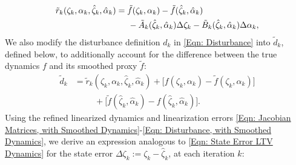 \documentclass[letterpaper, 10 pt, conference]{ieeeconf}
\newcommand{\?}{\stackrel{?}{=}}
\newcommand{\ratePGDNominal}{\hat\ratePGD}
\newcommand{\ratePGDError}{\Delta\ratePGD}
\newcommand{\linearizationError}{r}
\newcommand{\disturbance}{d}
\newcommand{\linearizationErrorSmoothed}{\tilde{\linearizationError}}
\newcommand{\disturbanceSmoothed}{\tilde{\disturbance}}
\newcommand{\ratePGD}{\alpha}
\newcommand{\jacobianState}{A}
\newcommand{\jacobianControl}{B}
\newcommand{\jacobianStateSmoothed}{\tilde{\jacobianState}}
\newcommand{\jacobianControlSmoothed}{\tilde{\jacobianControl}}
\newcommand{\state}{\zeta}
\newcommand{\stateNominal}{\hat\state}
\newcommand{\stateError}{\Delta\state}
\newcommand{\dynamicsFullState}{f}
\newcommand{\dynamicsFullStateSmoothed}{{\tilde{\dynamicsFullState}}}
\newcommand{\frank}[1]{{\textcolor[rgb]{0,0,1}{\textsf{[Frank: {#1}]}}}}
\newcommand{\antoine}[1]{{\textcolor[rgb]{1,0,0}{\textsf{[Antoine: {#1}]}}}}
\begin{document}
{
\setlength{\abovedisplayskip}{3.5pt}
\setlength{\belowdisplayskip}{3.5pt}
\begin{align}
\label{Eqn: Linearization Error, with Smoothed Dynamics}
    \linearizationErrorSmoothed_k(\state_k, \ratePGD_k, \stateNominal_k, \ratePGDNominal_k)  & = \dynamicsFullStateSmoothed(\state_k, \ratePGD_k) - \dynamicsFullStateSmoothed(\stateNominal_k, \ratePGDNominal_k) \\ \nonumber 
    &\hspace{5mm} - \jacobianStateSmoothed_k(\stateNominal_k, \ratePGDNominal_k) \stateError_k - \jacobianControlSmoothed_k(\stateNominal_k, \ratePGDNominal_k) \ratePGDError_k,
\end{align}
}
\hspace{-1mm}We also modify the disturbance definition $\disturbance_k$ in \eqref{Eqn: Disturbance}
into $\disturbanceSmoothed_k$,
defined below,
to additionally account for the difference between the true dynamics $\dynamicsFullState$ and its smoothed proxy $\dynamicsFullStateSmoothed$:
{
\setlength{\abovedisplayskip}{3.5pt}
\setlength{\belowdisplayskip}{3.5pt}
\begin{align} 
\label{Eqn: Disturbance, with Smoothed Dynamics}
    \disturbanceSmoothed_k &= \linearizationErrorSmoothed_k(\state_k, \ratePGD_k, \stateNominal_k, \ratePGDNominal_k) + \big[ \dynamicsFullState(\state_k, \ratePGD_k) - \dynamicsFullStateSmoothed(\state_k, \ratePGD_k) \big] \\ \nonumber
    &\hspace{1cm} + \big[ \dynamicsFullStateSmoothed(\stateNominal_k, \ratePGDNominal_k) - \dynamicsFullState(\stateNominal_k, \ratePGDNominal_k) \big].
\end{align}
}
\hspace{-1mm}Using the refined  linearized dynamics and linearization errors \eqref{Eqn: Jacobian Matrices, with Smoothed Dynamics}-\eqref{Eqn: Disturbance, with Smoothed Dynamics},
we derive an expression analogous to \eqref{Eqn: State Error LTV Dynamics} for the state error $\stateError_k := \state_k - \stateNominal_k$, at each iteration $k$:
\end{document}
